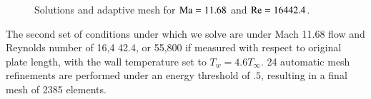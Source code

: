 \begin{figure}
\centering
{}
\caption{Solutions and adaptive mesh for ${\rm Ma} = 11.68$ and $\Reyn = 16442.4$.}
\label{fig:holdenMa11}
\end{figure}

The second set of conditions under which we solve are under Mach 11.68 flow and Reynolds number of 16,4	42.4, or 55,800 if measured with respect to original plate length, with the wall temperature set to $T_{w} = 4.6T_{\infty}$.  24 automatic mesh refinements are performed under an energy threshold of $.5$, resulting in a final mesh of 2385 elements.  

